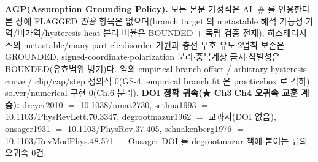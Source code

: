 \documentclass[11pt,a4paper]{article}
\begin{document}
\textbf{AGP(Assumption Grounding Policy).} 모든 본문 가정식은 AL-\# 를 인용한다. 본 장에 FLAGGED \emph{전용}
항목은 없으며(branch target 의 metastable 해석 가능성$\cdot$가역/비가역/hysteresis heat 분리 비율은 BOUNDED $+$
독립 검증 전제), 히스테리시스의 metastable/many-particle$\cdot$disorder 기원과 충전 부호 유도$\cdot$2법칙 보존은
GROUNDED, signed-coordinate$\cdot$polarization 분리$\cdot$중복계상 금지$\cdot$식별성은 BOUNDED(유효범위 병기)다.
임의 empirical branch offset / arbitrary hysteresis curve / clip/cap/step 정의식 0(GS-4; empirical branch fit
은 practicebox 로 격하). solver/numerical 구현 0(Ch.6 분리). \textbf{DOI 정확 귀속(★ Ch3$\cdot$Ch4 오귀속 교훈
계승):} dreyer2010 $=$ 10.1038/nmat2730, sethna1993 $=$ 10.1103/PhysRevLett.70.3347, degrootmazur1962 $=$
교과서(DOI 없음), onsager1931 $=$ 10.1103/PhysRev.37.405, schnakenberg1976 $=$ 10.1103/RevModPhys.48.571 —
Onsager DOI 를 degrootmazur 책에 붙이는 류의 오귀속 0건.

\end{document}
